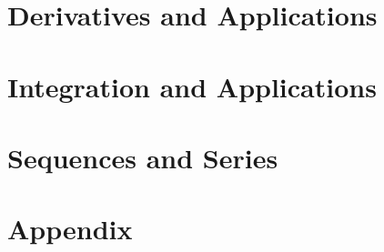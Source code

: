 \documentclass{article}
\theoremstyle{definition}
\theoremstyle{definition}
\begin{document}
\newpage
\part{Derivatives and Applications}

\newpage


\newpage
\part{Integration and Applications}

\newpage

\newpage

\newpage


\newpage
\part{Sequences and Series}


\newpage



\newpage

\part{Appendix}


\end{document}

